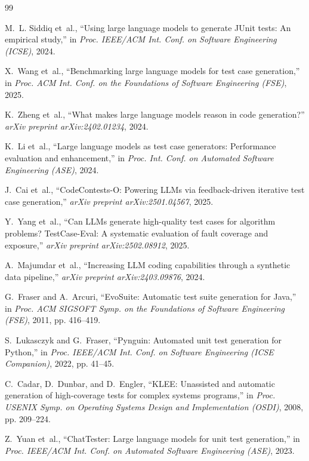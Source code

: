 \documentclass[conference]{IEEEtran}
\begin{document}

\begin{thebibliography}{99}

M.~L. Siddiq et~al., ``Using large language models to generate JUnit tests: An empirical study,'' in \emph{Proc. IEEE/ACM Int. Conf. on Software Engineering (ICSE)}, 2024.

X.~Wang et~al., ``Benchmarking large language models for test case generation,'' in \emph{Proc. ACM Int. Conf. on the Foundations of Software Engineering (FSE)}, 2025.

K.~Zheng et~al., ``What makes large language models reason in code generation?'' \emph{arXiv preprint arXiv:2402.01234}, 2024.

K.~Li et~al., ``Large language models as test case generators: Performance evaluation and enhancement,'' in \emph{Proc. Int. Conf. on Automated Software Engineering (ASE)}, 2024.

J.~Cai et~al., ``CodeContests-O: Powering LLMs via feedback-driven iterative test case generation,'' \emph{arXiv preprint arXiv:2501.04567}, 2025.

Y.~Yang et~al., ``Can LLMs generate high-quality test cases for algorithm problems? TestCase-Eval: A systematic evaluation of fault coverage and exposure,'' \emph{arXiv preprint arXiv:2502.08912}, 2025.

A.~Majumdar et~al., ``Increasing LLM coding capabilities through a synthetic data pipeline,'' \emph{arXiv preprint arXiv:2403.09876}, 2024.

G.~Fraser and A.~Arcuri, ``EvoSuite: Automatic test suite generation for Java,'' in \emph{Proc. ACM SIGSOFT Symp. on the Foundations of Software Engineering (FSE)}, 2011, pp. 416--419.

S.~Lukasczyk and G.~Fraser, ``Pynguin: Automated unit test generation for Python,'' in \emph{Proc. IEEE/ACM Int. Conf. on Software Engineering (ICSE Companion)}, 2022, pp. 41--45.

C.~Cadar, D.~Dunbar, and D.~Engler, ``KLEE: Unassisted and automatic generation of high-coverage tests for complex systems programs,'' in \emph{Proc. USENIX Symp. on Operating Systems Design and Implementation (OSDI)}, 2008, pp. 209--224.

Z.~Yuan et~al., ``ChatTester: Large language models for unit test generation,'' in \emph{Proc. IEEE/ACM Int. Conf. on Automated Software Engineering (ASE)}, 2023.


\end{thebibliography}
\end{document}
